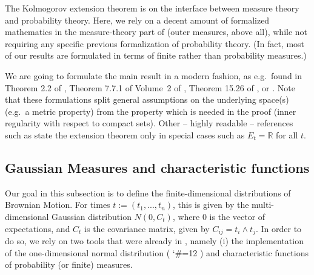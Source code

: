 \documentclass[lean]{Draft}
\makeatletter
\newcommand\leanlink{\begingroup\catcode`\#=12\relax\@leanlink}
\newcommand\@leanlink[2]{\endgroup
\href{#1}
{\texttt{\detokenize{#2}}}}
\newcommand{\docs}[1]{%
\leanlink{https://remydegenne.github.io/brownian-motion/docs/find/?pattern=#1\#doc}
{#1}}
\makeatother
\begin{document}
The Kolmogorov extension theorem is on the interface between measure theory and probability theory. Here, we rely on a decent amount of formalized mathematics in the measure-theory part of \mathlib (outer measures, above all), while not requiring any specific previous formalization of probability theory. (In fact, most of our results are formulated in terms of finite rather than probability measures.)

We are going to formulate the main result in a modern fashion, as e.g.\ found in Theorem 2.2 of \cite{rao1971projective}, Theorem 7.7.1 of Volume~2 of \cite{bogachev2007measure}, Theorem 15.26 of \cite{guide2006infinite}, or \cite{border1998expository}. Note that these formulations split general assumptions on the underlying space(s) (e.g.\ a metric property) from the property which is needed in the proof (inner regularity with respect to compact sets). Other -- highly readable -- references such as \cite{Billingsley1995} state the extension theorem only in special cases such as $E_t = \mathbb R$ for all $t$.


\subsection{Gaussian Measures and characteristic functions}
\label{ss:char}
Our goal in this subsection is to define the finite-dimensional distributions of Brownian Motion. For times $t := (t_1, ..., t_n)$, this is given by the multi-dimensional Gaussian distribution $N(0, C_t)$, where $0$ is the vector of expectations, and $C_t$ is the covariance matrix, given by $C_{ij} = t_i \wedge t_j$. In order to do so, we rely on two tools that were already in \mathlib, namely (i) the implementation of the one-dimensional normal distribution (\docs{ProbabilityTheory.gaussianReal}) and characteristic functions of probability (or finite) measures.
\end{document}
